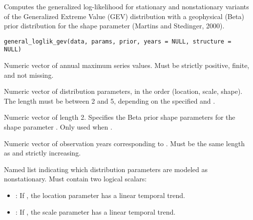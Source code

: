 \documentclass[a4paper]{book}
\begin{document}
%
\begin{Description}
Computes the generalized log-likelihood for stationary and nonstationary
variants of the Generalized Extreme Value (GEV) distribution with a geophysical
(Beta) prior distribution for the shape parameter (Martins and Stedinger, 2000).
\end{Description}
%
\begin{Usage}
\begin{verbatim}
general_loglik_gev(data, params, prior, years = NULL, structure = NULL)
\end{verbatim}
\end{Usage}
%
\begin{Arguments}
\begin{ldescription}
\item[\code{data}] Numeric vector of annual maximum series values.
Must be strictly positive, finite, and not missing.

\item[\code{params}] Numeric vector of distribution parameters, in the order (location,
scale, shape). The length must be between 2 and 5, depending on the specified
 and .

\item[\code{prior}] Numeric vector of length 2. Specifies the Beta prior shape
parameters  for the shape parameter \eqn{\kappa}{}.
Only used when .

\item[\code{years}] Numeric vector of observation years corresponding to .
Must be the same length as  and strictly increasing.

\item[\code{structure}] Named list indicating which distribution parameters are
modeled as nonstationary. Must contain two logical scalars:
\begin{itemize}

\item{} : If , the location parameter has a linear temporal trend.
\item{} : If , the scale parameter has a linear temporal trend.

\end{itemize}

\end{ldescription}
\end{Arguments}
\end{document}

